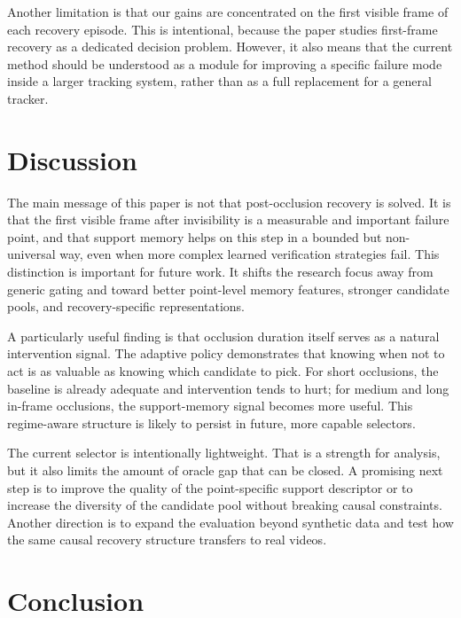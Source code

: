 \documentclass[10pt,journal,compsoc]{IEEEtran}
\begin{document}
Another limitation is that our gains are concentrated on the first visible frame of each recovery episode. This is intentional, because the paper studies first-frame recovery as a dedicated decision problem. However, it also means that the current method should be understood as a module for improving a specific failure mode inside a larger tracking system, rather than as a full replacement for a general tracker.

\section{Discussion}
\label{sec:discussion}

The main message of this paper is not that post-occlusion recovery is solved. It is that the first visible frame after invisibility is a measurable and important failure point, and that support memory helps on this step in a bounded but non-universal way, even when more complex learned verification strategies fail. This distinction is important for future work. It shifts the research focus away from generic gating and toward better point-level memory features, stronger candidate pools, and recovery-specific representations.

A particularly useful finding is that occlusion duration itself serves as a natural intervention signal. The adaptive policy demonstrates that knowing when not to act is as valuable as knowing which candidate to pick. For short occlusions, the baseline is already adequate and intervention tends to hurt; for medium and long in-frame occlusions, the support-memory signal becomes more useful. This regime-aware structure is likely to persist in future, more capable selectors.

The current selector is intentionally lightweight. That is a strength for analysis, but it also limits the amount of oracle gap that can be closed. A promising next step is to improve the quality of the point-specific support descriptor or to increase the diversity of the candidate pool without breaking causal constraints. Another direction is to expand the evaluation beyond synthetic data and test how the same causal recovery structure transfers to real videos.

\section{Conclusion}
\label{sec:conclusion}
\end{document}
